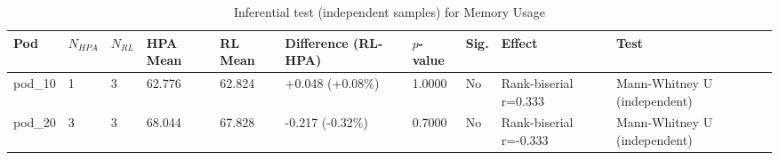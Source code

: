 \begin{table}[ht]
  \centering
  \caption{Inferential test (independent samples) for Memory Usage}\label{tab:inferensial-memory}
  \begin{tabular}{llllllllll}
    \toprule
    Pod & $N_{HPA}$ & $N_{RL}$ & HPA Mean & RL Mean & Difference (RL-HPA) & $p$-value & Sig. & Effect & Test \\
    \midrule
    pod\_10 & 1 & 3 & 62.776 & 62.824 & +0.048 (+0.08\%) & 1.0000 & No & Rank-biserial r=0.333 & Mann-Whitney U (independent) \\
    pod\_20 & 3 & 3 & 68.044 & 67.828 & -0.217 (-0.32\%) & 0.7000 & No & Rank-biserial r=-0.333 & Mann-Whitney U (independent) \\
    \bottomrule
  \end{tabular}
\end{table}